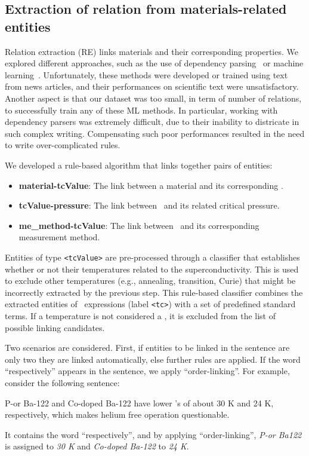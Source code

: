\subsection{Extraction of relation from materials-related entities}
\label{subsec:re-solution}
\label{subsubsec:linking}

Relation extraction (RE) links materials and their corresponding properties. 
We explored different approaches, such as the use of dependency parsing~\cite{yoshikawa:2017acl, Tiktinsky2020pyBARTES, swayamdipta:17, zhou-zhao-2019-head} or machine learning~\cite{lin2016neural,hariharan2019relation}. 
Unfortunately, these methods were developed or trained using text from news articles, and their performances on scientific text were unsatisfactory. 
Another aspect is that our dataset was too small, in term of number of relations, to successfully train any of these ML methods. 
In particular, working with dependency parsers was extremely difficult, due to their inability to districate in such complex writing. 
Compensating such poor performances resulted in the need to write over-complicated rules. 

We developed a rule-based algorithm that links together pairs of entities:
\begin{itemize}
    \item \textbf{material-tcValue}: The link between a material and its corresponding \tc.
    \item \textbf{tcValue-pressure}: The link between \tc~and its related critical pressure.
    \item \textbf{me\_method-tcValue}: The link between \tc~and its corresponding measurement method.
\end{itemize}

Entities of type \texttt{<tcValue>} are pre-processed through a classifier that establishes whether or not their temperatures related to the superconductivity. This is used to exclude other temperatures (e.g., annealing, transition, Curie) that might be incorrectly extracted by the previous step.
This rule-based classifier combines the extracted entities of \tc~expressions (label \texttt{<tc>}) with a set of predefined standard terms.
If a temperature is not considered a \tc, it is excluded from the list of possible linking candidates.

Two scenarios are considered. First, if entities to be linked in the sentence are only two they are linked automatically, else further rules are applied. 
If the word ``respectively'' appears in the sentence, we apply ``order-linking''. 
For example, consider the following sentence:
\begin{displayquote}
    P-or Ba-122  and Co-doped Ba-122 have lower \tc's of about 30 K and 24 K, respectively, which makes helium free operation questionable.
\end{displayquote}
It contains the word ``respectively'', and by applying ``order-linking'', \textit{P-or Ba122} is assigned to \textit{30 K} and \textit{Co-doped Ba-122} to \textit{24 K}.


